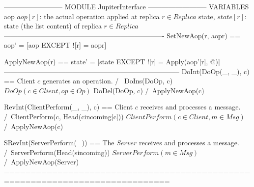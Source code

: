 \documentclass{article}
\begin{document}
\begin{tla}
-------------------------- MODULE JupiterInterface --------------------------
VARIABLES 
    aop     \* $aop[r]$: the actual operation applied at replica $r \in Replica$
    state,  \* $state[r]$: state (the list content) of replica $r \in Replica$
----------------------------------------------------------------------
SetNewAop(r, aopr) == aop' = [aop EXCEPT ![r] = aopr]

ApplyNewAop(r) == state' = [state EXCEPT ![r] = Apply(aop'[r], @)]
-----------------------------------------------------------------------------
DoInt(DoOp(_, _), c) == \* Client $c$ generates an operation.
    /\ \/ DoIns(DoOp, c)\* $DoOp(c \in Client, op \in Op)$
       \/ DoDel(DoOp, c)
    /\ ApplyNewAop(c)
    
RevInt(ClientPerform(_, _), c) == \* Client $c$ receives and processes a message.
    /\ ClientPerform(c, Head(cincoming[c])) \* $ClientPerform(c \in Client, m \in Msg)$
    /\ ApplyNewAop(c)

SRevInt(ServerPerform(_)) == \* The $Server$ receives and processes a message.
    /\ ServerPerform(Head(sincoming)) \* $ServerPerform(m \in Msg)$
    /\ ApplyNewAop(Server)
=============================================================================
\end{tla}
\end{document}
